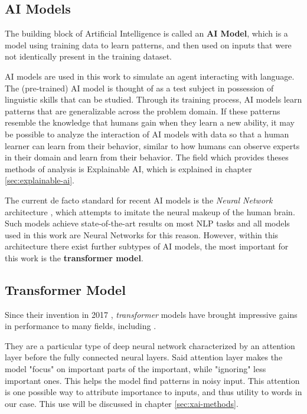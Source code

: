 \subsection{AI Models}
The building block of Artificial Intelligence is called an \textbf{AI Model}, which is a model using training data to learn patterns, and then used on inputs that were not identically present in the training dataset.

AI models are used in this work to simulate an agent interacting with language.
The (pre-trained) AI model is thought of as a test subject in possession of linguistic skills that can be studied.
Through its training process, AI models learn patterns that are generalizable across the problem domain.
If these patterns resemble the knowledge that humans gain when they learn a new ability, it may be possible to analyze the interaction of AI models with data so that a human learner can learn from their behavior, similar to how humans can observe experts in their domain and learn from their behavior.
The field which provides theses methods of analysis is Explainable AI, which is explained in chapter \ref{sec:explainable-ai}.

The current de facto standard for recent AI models is the \textit{Neural Network} architecture \cite{jurafskySpeechLanguageProcessing2025}, which attempts to imitate the neural makeup of the human brain.
Such models achieve state-of-the-art results on most NLP tasks  and all models used in this work are Neural Networks for this reason.
However, within this architecture there exist further subtypes of AI models, the most important for this work is the \textbf{transformer model}.


\subsection{Transformer Model} \label{sec:transformer}
Since their invention in 2017 \cite{vaswani2017attention}, \textit{transformer} models have brought impressive gains in performance to many fields, including \NLP.

They are a particular type of deep neural network characterized by an attention layer before the fully connected neural layers.
Said attention layer makes the model "focus" on important parts of the important, while "ignoring" less important ones.
This helps the model find patterns in noisy input.
This attention is one possible way to attribute importance to inputs, and thus utility to words in our case.
This use will be discussed in chapter \ref{sec:xai-methods}.

